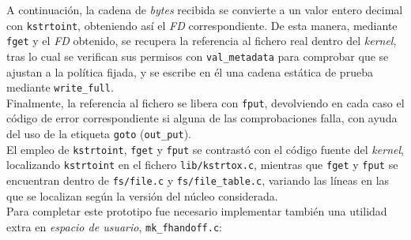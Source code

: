 A continuación, la cadena de \textit{bytes} recibida se convierte a un valor entero decimal con \verb|kstrtoint|, obteniendo así el \textit{FD} correspondiente.
De esta manera, mediante \verb|fget| y el \textit{FD} obtenido, se recupera la referencia al fichero real dentro del \textit{kernel}, tras lo cual se verifican sus permisos con \verb|val_metadata| para comprobar que se ajustan a la política fijada, y se escribe en él una cadena estática de prueba mediante \verb|write_full|.\\

Finalmente, la referencia al fichero se libera con \verb|fput|, devolviendo en cada caso el código de error correspondiente si alguna de las comprobaciones falla, con ayuda del uso de la etiqueta \verb|goto| (\verb|out_put|).\\

El empleo de \verb|kstrtoint|, \verb|fget| y \verb|fput| se contrastó con el código fuente del \textit{kernel}, localizando \verb|kstrtoint| en el fichero \texttt{lib/kstrtox.c}, mientras que \verb|fget| y \verb|fput| se encuentran dentro de \texttt{fs/file.c} y \texttt{fs/file\_table.c}, variando las líneas en las que se localizan según la versión del núcleo considerada.\\

Para completar este prototipo fue necesario implementar también una utilidad extra en \textit{espacio de usuario}, \texttt{mk\_fhandoff.c}:

